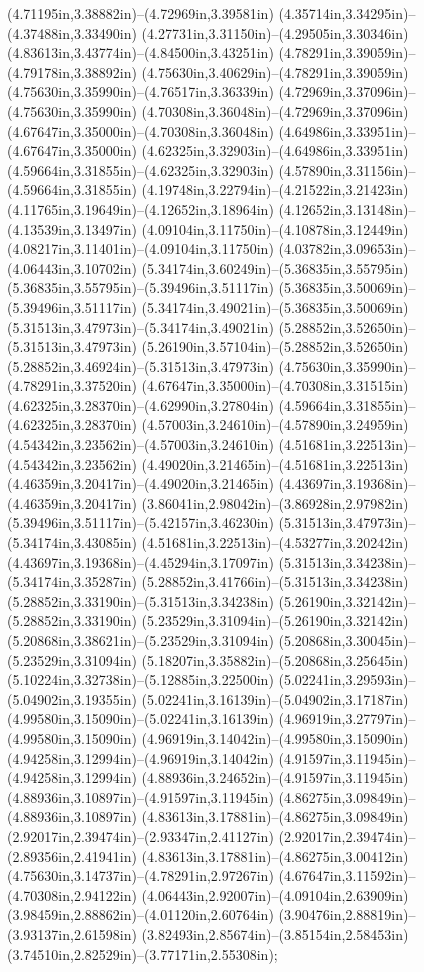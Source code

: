 (4.71195in,3.38882in)--(4.72969in,3.39581in) (4.35714in,3.34295in)--(4.37488in,3.33490in) (4.27731in,3.31150in)--(4.29505in,3.30346in) (4.83613in,3.43774in)--(4.84500in,3.43251in) (4.78291in,3.39059in)--(4.79178in,3.38892in) (4.75630in,3.40629in)--(4.78291in,3.39059in) (4.75630in,3.35990in)--(4.76517in,3.36339in) (4.72969in,3.37096in)--(4.75630in,3.35990in) (4.70308in,3.36048in)--(4.72969in,3.37096in) (4.67647in,3.35000in)--(4.70308in,3.36048in) (4.64986in,3.33951in)--(4.67647in,3.35000in) (4.62325in,3.32903in)--(4.64986in,3.33951in) (4.59664in,3.31855in)--(4.62325in,3.32903in) (4.57890in,3.31156in)--(4.59664in,3.31855in) (4.19748in,3.22794in)--(4.21522in,3.21423in) (4.11765in,3.19649in)--(4.12652in,3.18964in) (4.12652in,3.13148in)--(4.13539in,3.13497in) (4.09104in,3.11750in)--(4.10878in,3.12449in) (4.08217in,3.11401in)--(4.09104in,3.11750in) (4.03782in,3.09653in)--(4.06443in,3.10702in) (5.34174in,3.60249in)--(5.36835in,3.55795in) (5.36835in,3.55795in)--(5.39496in,3.51117in) (5.36835in,3.50069in)--(5.39496in,3.51117in) (5.34174in,3.49021in)--(5.36835in,3.50069in) (5.31513in,3.47973in)--(5.34174in,3.49021in) (5.28852in,3.52650in)--(5.31513in,3.47973in) (5.26190in,3.57104in)--(5.28852in,3.52650in) (5.28852in,3.46924in)--(5.31513in,3.47973in) (4.75630in,3.35990in)--(4.78291in,3.37520in) (4.67647in,3.35000in)--(4.70308in,3.31515in) (4.62325in,3.28370in)--(4.62990in,3.27804in) (4.59664in,3.31855in)--(4.62325in,3.28370in) (4.57003in,3.24610in)--(4.57890in,3.24959in) (4.54342in,3.23562in)--(4.57003in,3.24610in) (4.51681in,3.22513in)--(4.54342in,3.23562in) (4.49020in,3.21465in)--(4.51681in,3.22513in) (4.46359in,3.20417in)--(4.49020in,3.21465in) (4.43697in,3.19368in)--(4.46359in,3.20417in) (3.86041in,2.98042in)--(3.86928in,2.97982in) (5.39496in,3.51117in)--(5.42157in,3.46230in) (5.31513in,3.47973in)--(5.34174in,3.43085in) (4.51681in,3.22513in)--(4.53277in,3.20242in) (4.43697in,3.19368in)--(4.45294in,3.17097in) (5.31513in,3.34238in)--(5.34174in,3.35287in) (5.28852in,3.41766in)--(5.31513in,3.34238in) (5.28852in,3.33190in)--(5.31513in,3.34238in) (5.26190in,3.32142in)--(5.28852in,3.33190in) (5.23529in,3.31094in)--(5.26190in,3.32142in) (5.20868in,3.38621in)--(5.23529in,3.31094in) (5.20868in,3.30045in)--(5.23529in,3.31094in) (5.18207in,3.35882in)--(5.20868in,3.25645in) (5.10224in,3.32738in)--(5.12885in,3.22500in) (5.02241in,3.29593in)--(5.04902in,3.19355in) (5.02241in,3.16139in)--(5.04902in,3.17187in) (4.99580in,3.15090in)--(5.02241in,3.16139in) (4.96919in,3.27797in)--(4.99580in,3.15090in) (4.96919in,3.14042in)--(4.99580in,3.15090in) (4.94258in,3.12994in)--(4.96919in,3.14042in) (4.91597in,3.11945in)--(4.94258in,3.12994in) (4.88936in,3.24652in)--(4.91597in,3.11945in) (4.88936in,3.10897in)--(4.91597in,3.11945in) (4.86275in,3.09849in)--(4.88936in,3.10897in) (4.83613in,3.17881in)--(4.86275in,3.09849in) (2.92017in,2.39474in)--(2.93347in,2.41127in) (2.92017in,2.39474in)--(2.89356in,2.41941in) (4.83613in,3.17881in)--(4.86275in,3.00412in) (4.75630in,3.14737in)--(4.78291in,2.97267in) (4.67647in,3.11592in)--(4.70308in,2.94122in) (4.06443in,2.92007in)--(4.09104in,2.63909in) (3.98459in,2.88862in)--(4.01120in,2.60764in) (3.90476in,2.88819in)--(3.93137in,2.61598in) (3.82493in,2.85674in)--(3.85154in,2.58453in) (3.74510in,2.82529in)--(3.77171in,2.55308in);
